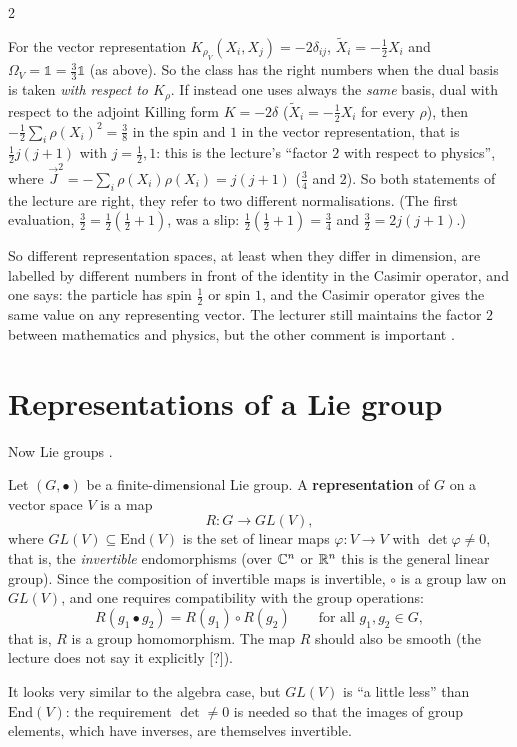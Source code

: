 \begin{paracol}{2}
\begin{coursenote}
\[\]
For the vector representation $K_{\rho_V}(X_i,X_j)=-2\delta_{ij}$, $\tilde X_i=-\frac12X_i$ and $\Omega_V=\mathbb 1=\frac33\mathbb 1$ (as above). So the class has the right numbers when the dual basis is taken \emph{with respect to $K_\rho$}. If instead one uses always the \emph{same} basis, dual with respect to the adjoint Killing form $K=-2\delta$ ($\tilde X_i=-\frac12X_i$ for every $\rho$), then $-\frac12\sum_i\rho(X_i)^2=\frac38$ in the spin and $1$ in the vector representation, that is $\frac12j(j+1)$ with $j=\frac12,1$: this is the lecture's ``factor $2$ with respect to physics'', where $\vec J^2=-\sum_i\rho(X_i)\rho(X_i)=j(j+1)$ ($\frac34$ and $2$). So both statements of the lecture are right, they refer to two different normalisations. (The first evaluation, $\frac32=\frac12(\frac12+1)$, was a slip: $\frac12(\frac12+1)=\frac34$ and $\frac32=2j(j+1)$.) 
\end{coursenote}
So different representation spaces, at least when they differ in dimension, are labelled by different numbers in front of the identity in the Casimir operator, and one says: the particle has spin $\frac12$ or spin $1$, and the Casimir operator gives the same value on any representing vector. The lecturer still maintains the factor $2$ between mathematics and physics, but the other comment is important   .

\section{Representations of a Lie group}\label{sec:rp-group}

Now Lie groups .
\begin{definition}\label{def:rp-grouprep}
Let $(G,\bullet)$ be a finite-dimensional Lie group. A \textbf{representation} of $G$ on a vector space $V$ is a map
\[
  R\colon G\to GL(V),
\]
where $GL(V)\subseteq\mathrm{End}(V)$ is the set of linear maps $\varphi\colon V\to V$ with $\det\varphi\ne0$, that is, the \emph{invertible} endomorphisms (over $\mathbb{C}^n$ or $\mathbb{R}^n$ this is the general linear group). Since the composition of invertible maps is invertible, $\circ$ is a group law on $GL(V)$, and one requires compatibility with the group operations:
\[
  R(g_1\bullet g_2)=R(g_1)\circ R(g_2)\qquad\text{for all }g_1,g_2\in G ,
\]
that is, $R$ is a group homomorphism. The map $R$ should also be smooth (the lecture does not say it explicitly [?]).        
\end{definition}
It looks very similar to the algebra case, but $GL(V)$ is ``a little less'' than $\mathrm{End}(V)$: the requirement $\det\ne0$ is needed so that the images of group elements, which have inverses, are themselves invertible.


\end{paracol}
